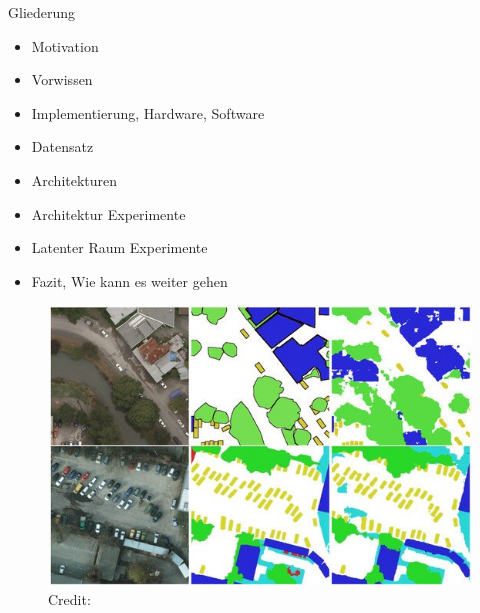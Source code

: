 \begin{frame}{Gliederung}
	\begin{itemize}
		\item Motivation
		\item Vorwissen
		\item Implementierung, Hardware, Software
		\item Datensatz
		\item Architekturen
		\item Architektur Experimente
		\item Latenter Raum Experimente
		\item Fazit, Wie kann es weiter gehen
	\end{itemize}
\end{frame}


\begin{frame}
	\begin{figure}
		\includegraphics[width=\textwidth]{images/figures/presentation/semantic_segmentation.jpg}
		\vspace*{15pt}\hbox{\scriptsize Credit:}
	\end{figure}
\end{frame}

